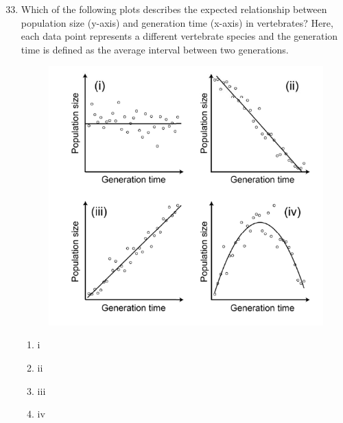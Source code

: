 \documentclass[journal,12pt,onecolumn]{IEEEtran}
\theoremstyle{remark}
\begin{document}
\begin{enumerate}
\setcounter{enumi}{32}

\item Which of the following plots describes the expected relationship between population size (y-axis) and generation time (x-axis) in vertebrates? Here, each data point represents a different vertebrate species and the generation time is defined as the average interval between two generations.
\begin{figure}[h]
    \centering
    \includegraphics[]{figs/33.png}
\end{figure}


\begin{multicols}{4}
\begin{enumerate}
\item i
\item ii
\item iii
\item iv
\end{enumerate}
\end{multicols}


\end{enumerate}
\end{document}
